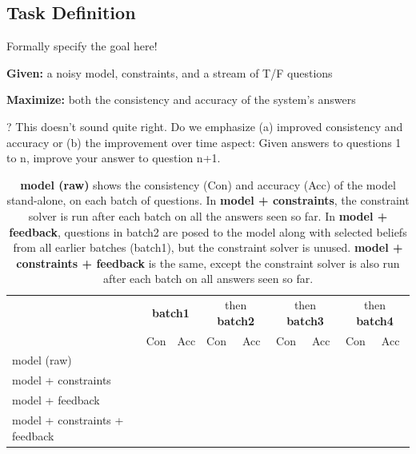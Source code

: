 \documentclass[11pt]{article}
\newenvironment{des}{                 %
     \parskip 0cm \begin{list}{}{\parsep 0cm \itemsep 0cm \topsep 0cm}}{
       \end{list}} %
\begin{document}
\subsection{Task Definition}

Formally specify the goal here!

\begin{des}
\item[{\bf Given:}] a noisy model, constraints, and a stream of T/F questions
\item[{\bf Maximize:}] both the consistency and accuracy of the system's answers
\end{des}
? This doesn't sound quite right. Do we emphasize (a) improved consistency and
accuracy or (b) the improvement over time aspect: Given answers to questions
1 to n, improve your answer to question n+1. 







\begin{table}
\centering
{\small
\begin{tabular}{|l|ll||ll||ll||ll|} \hline
& \multicolumn{2}{|c|}{\bf batch1} &
\multicolumn{2}{|c|}{then {\bf batch2}} &
\multicolumn{2}{|c|}{then {\bf batch3}} &
\multicolumn{2}{|c|}{then {\bf batch4}} \\
& Con & Acc & Con & Acc & Con & Acc & Con & Acc \\ \hline           
model (raw) & & & & & & & & \\
model + constraints & & & & & & & & \\
model + feedback & & & & & & & & \\
model + constraints + feedback & & & & & & & & \\ \hline
\end{tabular}
}
\caption{{\bf model (raw)} shows the consistency (Con) and accuracy (Acc) of the
model stand-alone, on each batch of questions. 
 In {\bf model + constraints}, the constraint solver is run
 after each batch on all the answers seen so far. In {\bf model + feedback},
 questions in batch2 are posed to the model along with selected beliefs from
 all earlier batches (batch1), but the constraint solver is unused. 
 {\bf model + constraints + feedback} is the same, except the constraint solver is also run
 after each batch on all answers seen so far.
\label{incremental-improvement}}
\end{table}
\end{document}
